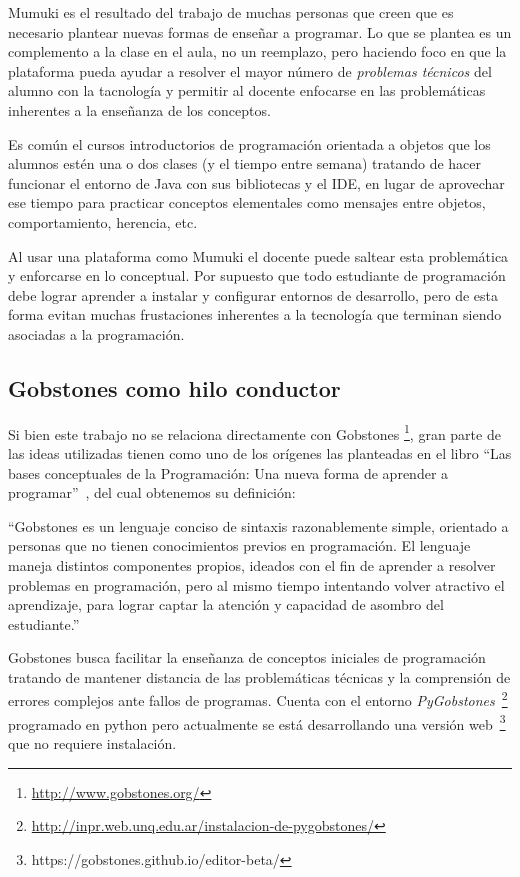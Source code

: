Mumuki es el resultado del trabajo de muchas personas que creen
que es necesario plantear nuevas formas de enseñar a programar.
Lo que se plantea es un complemento a la clase en el aula, no
un reemplazo, pero haciendo foco en que la plataforma pueda ayudar
a resolver el mayor número de \textit{problemas técnicos}
del alumno con la tacnología y permitir al docente enfocarse
en las problemáticas inherentes a la enseñanza de los conceptos.

Es común el cursos introductorios de programación orientada a objetos que los alumnos
estén una o dos clases (y el tiempo entre semana) tratando de hacer funcionar
el entorno de Java con sus bibliotecas y el IDE, en lugar de
aprovechar ese tiempo para practicar conceptos elementales como mensajes
entre objetos, comportamiento, herencia, etc.

Al usar una plataforma como Mumuki el docente puede saltear esta problemática
y enforcarse en lo conceptual. Por supuesto que todo estudiante de programación
debe lograr aprender a instalar y configurar entornos de desarrollo, pero
de esta forma evitan muchas frustaciones inherentes a la tecnología
que terminan siendo asociadas a la programación.

\subsection{Gobstones como hilo conductor}

Si bien este trabajo no se relaciona directamente con Gobstones
\footnote{\url{http://www.gobstones.org/}},
gran parte de las ideas utilizadas tienen como uno
de los orígenes las planteadas en el libro
\enquote{Las bases conceptuales de la Programación: Una nueva forma de aprender a programar}~\cite{LibroGobstones}, del cual obtenemos su definición:

\begin{displayquote}
``Gobstones es un lenguaje conciso de sintaxis razonablemente simple,
orientado a personas que no tienen conocimientos previos en programación.
El lenguaje maneja distintos componentes propios, ideados con el fin de
aprender a resolver problemas en programación,  pero al mismo tiempo
intentando volver atractivo el aprendizaje, para lograr captar la atención
y capacidad de asombro del estudiante.''
\end{displayquote}

Gobstones busca facilitar la enseñanza de conceptos iniciales de programación
tratando de mantener distancia de las problemáticas técnicas y
la comprensión de errores complejos ante fallos de programas.
Cuenta con el entorno \textit{PyGobstones}~\footnote{\url{http://inpr.web.unq.edu.ar/instalacion-de-pygobstones/}} programado en python
pero actualmente se está desarrollando una versión web~\footnote{https://gobstones.github.io/editor-beta/} que no requiere instalación.


